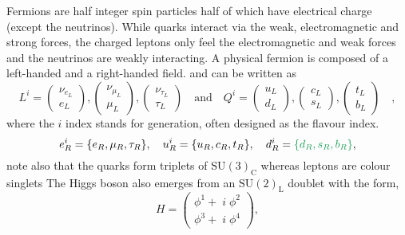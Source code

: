 Fermions are half integer spin particles\Joaoadd{,} half of which have electrical charge (except the neutrinos).  While quarks interact via the weak, electromagnetic and strong forces, the charged leptons only feel the electromagnetic and weak forces and the neutrinos are weakly interacting.  
%
A physical fermion is composed of a left-handed and a right-handed field.  and can be written as
%
\begin{equation}\label{eq:Left_boys}
L^i= \begin{pmatrix}
\nu_{e_L} \\ e_L 
\end{pmatrix},
\begin{pmatrix}
\nu_{\mu_L} \\ \mu_L 
\end{pmatrix},
\begin{pmatrix}
\nu_{\tau_L} \\ \tau_L 
\end{pmatrix} 
\quad 
\text{and} \quad Q^i= \begin{pmatrix}
u_{L} \\
d_L 
\end{pmatrix},\begin{pmatrix}
c_{L} \\
s_L 
\end{pmatrix}
,\begin{pmatrix}
t_{L} \\
b_L 
\end{pmatrix} \quad ,
\end{equation}
where the $i$ index stands for generation, often designed as the flavour index. 
%
\begin{equation}\label{eq:Right_boys}
e^i_R=\{e_R,\mu_R,\tau_R\}, \quad  u^i_R=\{u_R,c_R,t_R\}, \quad d^i_R=\Joaoadd{\{d_{R},s_{R},b_{R}\}}, 
\end{equation}
%
note also that the quarks form triplets of $\mathrm{SU(3)_C}$ whereas leptons are colour singlets  The Higgs boson also emerges from an $\mathrm{SU(2)_L}$ doublet with the form,
%
\begin{equation}\label{eq:Higgs_doublet}
H=\begin{pmatrix}
\phi^1 + \; i \; \phi^2 \\
\phi^3 + \; i \; \phi^4  
\end{pmatrix}, 
\end{equation}
